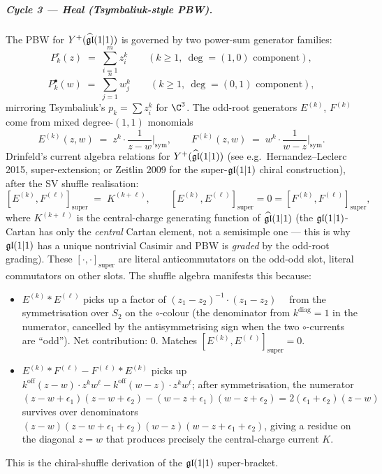 \subparagraph{Cycle 3 --- Heal (Tsymbaliuk-style PBW).} The PBW for
$Y^+(\widehat{\mathfrak{gl}}(1|1))$ is governed by two power-sum generator families:
\[
  P_k^\circ(z) \;=\; \sum_{i=1}^m z_i^k
  \qquad(k\geq 1,\ \deg=(1,0)\text{ component}),
\]
\[
  P_k^\bullet(w) \;=\; \sum_{j=1}^n w_j^k
  \qquad(k\geq 1,\ \deg=(0,1)\text{ component}),
\]
mirroring Tsymbaliuk's $p_k = \sum z_i^k$ for $\C^3$. The odd-root
generators $E^{(k)}$, $F^{(k)}$ come from mixed degree-$(1,1)$ monomials
\[
  E^{(k)}(z,w) \;=\; z^k\cdot\frac{1}{z-w}\Big|_{\mathrm{sym}},
  \qquad
  F^{(k)}(z,w) \;=\; w^k\cdot\frac{1}{w-z}\Big|_{\mathrm{sym}}.
\]
Drinfeld's current algebra relations for $Y^+(\widehat{\mathfrak{gl}}(1|1))$ (see
e.g.\ Hernandez--Leclerc 2015, super-extension; or Zeitlin 2009 for the
super-$\mathfrak{gl}(1|1)$ chiral construction), after the SV shuffle realisation:
\[
  [E^{(k)}, F^{(\ell)}]_{\mathrm{super}}
  \;=\;
  K^{(k+\ell)},\qquad [E^{(k)},E^{(\ell)}]_{\mathrm{super}}=0=[F^{(k)},
  F^{(\ell)}]_{\mathrm{super}},
\]
where $K^{(k+\ell)}$ is the central-charge generating function of
$\widehat{\mathfrak{gl}}(1|1)$ (the $\mathfrak{gl}(1|1)$-Cartan has only the \emph{central}
Cartan element, not a semisimple one --- this is why $\mathfrak{gl}(1|1)$ has a
unique nontrivial Casimir and PBW is \emph{graded} by the odd-root grading).
These $[\cdot,\cdot]_{\mathrm{super}}$ are literal anticommutators on
the odd-odd slot, literal commutators on other slots. The shuffle algebra
manifests this because:
\begin{itemize}
  \item $E^{(k)}\ast E^{(\ell)}$ picks up a factor of
  $(z_1-z_2)^{-1}\cdot(z_1-z_2)^{\phantom{-1}}$ from the symmetrisation
  over $S_2$ on the $\circ$-colour (the denominator from
  $k^{\mathrm{diag}}=1$ in the numerator, cancelled by the antisymmetrising
  sign when the two $\circ$-currents are ``odd''). Net contribution: $0$.
  Matches $[E^{(k)}, E^{(\ell)}]_{\mathrm{super}}=0$.
  \item $E^{(k)}\ast F^{(\ell)} - F^{(\ell)}\ast E^{(k)}$ picks up
  $k^{\mathrm{off}}(z-w)\cdot z^k w^\ell - k^{\mathrm{off}}(w-z)\cdot
  z^k w^\ell$; after symmetrisation, the numerator $(z-w+\epsilon_1)
  (z-w+\epsilon_2)-(w-z+\epsilon_1)(w-z+\epsilon_2) = 2(\epsilon_1+
  \epsilon_2)(z-w)$ survives over denominators $(z-w)(z-w+\epsilon_1+
  \epsilon_2)(w-z)(w-z+\epsilon_1+\epsilon_2)$, giving a residue on the
  diagonal $z=w$ that produces precisely the central-charge current $K$.
\end{itemize}
This is the chiral-shuffle derivation of the $\mathfrak{gl}(1|1)$ super-bracket.

